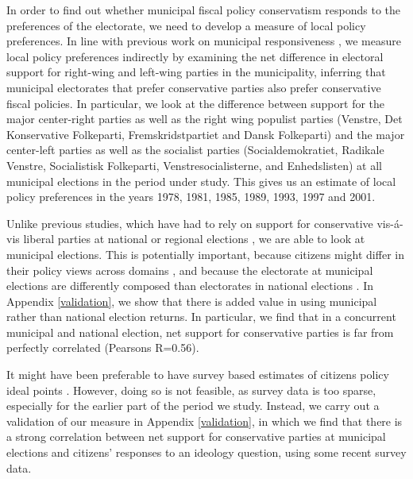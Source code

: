 \documentclass[a4paper,12pt]{article}
\begin{document}
In order to find out whether municipal fiscal policy conservatism responds to the preferences of the electorate, we need to develop a measure of local policy preferences. In line with previous work on municipal responsiveness \cite[e.g.,][]{sances2017ideology,einstein2016pushing}, we measure local policy preferences indirectly by examining the net difference in electoral support for right-wing and left-wing parties in the municipality, inferring that municipal electorates that prefer conservative parties also prefer conservative fiscal policies. In particular, we look at the difference between support for the major center-right parties as well as the right wing populist parties (Venstre, Det Konservative Folkeparti, Fremskridstpartiet and Dansk Folkeparti) and the major center-left parties as well as the socialist parties (Socialdemokratiet, Radikale Venstre, Socialistisk Folkeparti, Venstresocialisterne, and Enhedslisten) at all municipal elections in the period under study. This gives us an estimate of local policy preferences in the years 1978, 1981, 1985, 1989, 1993, 1997 and 2001.

 Unlike previous studies, which have had to rely on support for conservative vis-á-vis liberal parties at national or regional elections \citep[e.g.,][]{hajnal2010or,einstein2016pushing}, we are able to look at municipal elections. This is potentially important, because citizens might differ in their policy views across domains \cite[for an argument along these lines, see]{abrams2012big}, and because the electorate at municipal elections are differently composed than electorates in national elections \citep{ansolabehere2015beyond}. In Appendix  \ref{validation}, we show that there is added value in using municipal rather than national election returns. In particular, we find that in a concurrent municipal and national election, net support for conservative parties is far from perfectly correlated (Pearsons R=0.56).
 
 It might have been preferable to have survey based estimates of citizens policy ideal points \citep[similar to the measure used by][]{tausanovitch2014representation}. However, doing so is not feasible, as survey data is too sparse, especially for the earlier part of the period we study. Instead, we carry out a validation of our measure in Appendix \ref{validation}, in which we find that there is a strong correlation between net support for conservative parties at municipal elections and citizens' responses to an ideology question, using some recent survey data.
\end{document}
